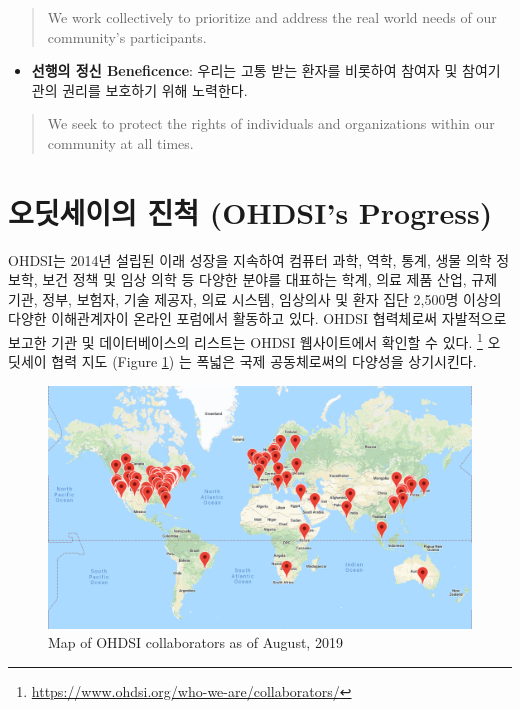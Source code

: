 \documentclass[11pt]{book}
\providecommand{\tightlist}{%
  \setlength{\itemsep}{0pt}\setlength{\parskip}{0pt}}
\let\rmarkdownfootnote\footnote%
\def\footnote{\protect\rmarkdownfootnote}
\theoremstyle{definition}
\theoremstyle{definition}
\theoremstyle{definition}
\theoremstyle{remark}
\begin{document}
\begin{quote}
We work collectively to prioritize and address the real world needs of
our community's participants.
\end{quote}

\begin{itemize}
\tightlist
\item
  \textbf{선행의 정신 Beneficence}: 우리는 고통 받는 환자를 비롯하여
  참여자 및 참여기관의 권리를 보호하기 위해 노력한다.
\end{itemize}

\begin{quote}
We seek to protect the rights of individuals and organizations within
our community at all times.
\end{quote}


\section{오딧세이의 진척 (OHDSI's Progress)}\label{--ohdsis-progress}

OHDSI는 2014년 설립된 이래 성장을 지속하여 컴퓨터 과학, 역학, 통계, 생물
의학 정보학, 보건 정책 및 임상 의학 등 다양한 분야를 대표하는 학계, 의료
제품 산업, 규제 기관, 정부, 보험자, 기술 제공자, 의료 시스템, 임상의사
및 환자 집단 2,500명 이상의 다양한 이해관계자이 온라인 포럼에서 활동하고
있다. OHDSI 협력체로써 자발적으로 보고한 기관 및 데이터베이스의 리스트는
OHDSI 웹사이트에서 확인할 수 있다. \footnote{\url{https://www.ohdsi.org/who-we-are/collaborators/}}
오딧세이 협력 지도 (Figure \ref{fig:collaboratormap}) 는 폭넓은 국제
공동체로써의 다양성을 상기시킨다.

\begin{figure}

{\centering \includegraphics[width=1\linewidth]{images/OhdsiCommunity/mapOfCollaborators} 

}

\caption{Map of OHDSI collaborators as of August, 2019}\label{fig:collaboratormap}
\end{figure}
\end{document}
